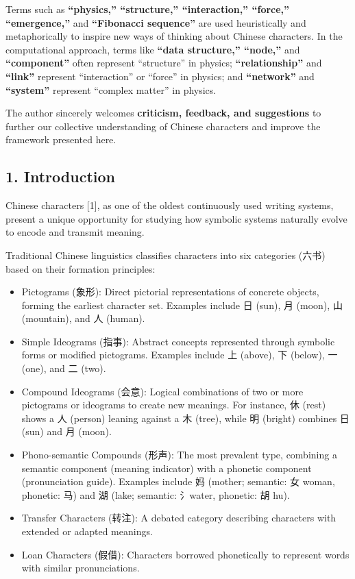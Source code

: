 \documentclass[
  11pt,
  letterpaper,
]{article}
\begin{document}
Terms such as \textbf{``physics,'' ``structure,'' ``interaction,''
``force,'' ``emergence,''} and \textbf{``Fibonacci sequence''} are used
heuristically and metaphorically to inspire new ways of thinking about
Chinese characters. In the computational approach, terms like
\textbf{``data structure,'' ``node,''} and \textbf{``component''} often
represent ``structure'' in physics; \textbf{``relationship''} and
\textbf{``link''} represent ``interaction'' or ``force'' in physics; and
\textbf{``network''} and \textbf{``system''} represent ``complex
matter'' in physics.

The author sincerely welcomes \textbf{criticism, feedback, and
suggestions} to further our collective understanding of Chinese
characters and improve the framework presented here.

\hypertarget{introduction}{%
\subsection{1. Introduction}\label{introduction}}

Chinese characters {[}1{]}, as one of the oldest continuously used
writing systems, present a unique opportunity for studying how symbolic
systems naturally evolve to encode and transmit meaning.

Traditional Chinese linguistics classifies characters into six
categories (六书) based on their formation principles:

\begin{itemize}
\item
  Pictograms (象形): Direct pictorial representations of concrete
  objects, forming the earliest character set. Examples include 日
  (sun), 月 (moon), 山 (mountain), and 人 (human).
\item
  Simple Ideograms (指事): Abstract concepts represented through
  symbolic forms or modified pictograms. Examples include 上 (above), 下
  (below), 一 (one), and 二 (two).
\item
  Compound Ideograms (会意): Logical combinations of two or more
  pictograms or ideograms to create new meanings. For instance, 休
  (rest) shows a 人 (person) leaning against a 木 (tree), while 明
  (bright) combines 日 (sun) and 月 (moon).
\item
  Phono-semantic Compounds (形声): The most prevalent type, combining a
  semantic component (meaning indicator) with a phonetic component
  (pronunciation guide). Examples include 妈 (mother; semantic: 女
  woman, phonetic: 马) and 湖 (lake; semantic: 氵water, phonetic: 胡
  hu).
\item
  Transfer Characters (转注): A debated category describing characters
  with extended or adapted meanings.
\item
  Loan Characters (假借): Characters borrowed phonetically to represent
  words with similar pronunciations.
\end{itemize}
\end{document}
